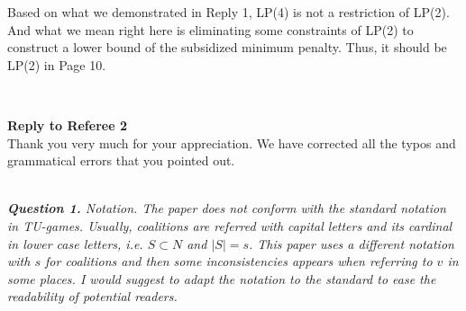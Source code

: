 \documentclass[11pt]{article}
\begin{document}
Based on what we demonstrated in Reply 1, LP(4) is not a restriction of LP(2). And what we mean right here is eliminating some constraints of LP(2) to construct a lower bound of the subsidized minimum penalty. Thus, it should be LP(2) in Page 10.


%
%

%
%
%
\\[4mm]

\newpage

\noindent \textbf{\large Reply to Referee 2}
\\[3mm]
Thank you very much for your appreciation.
We have corrected all the typos and grammatical errors that you pointed out.

\\[4mm]
%
%
%
\noindent \textit{\textbf{Question 1.}
Notation. The paper does not conform with the standard notation in
TU-games. Usually, coalitions are referred with capital letters and its
cardinal in lower case letters, i.e. $S \subset N$ and $|S| = s$. This paper uses a different notation with $s$ for coalitions and then some inconsistencies
appears when referring to $v$ in some places. I would suggest to adapt
the notation to the standard to ease the readability of potential readers.}
\end{document}
